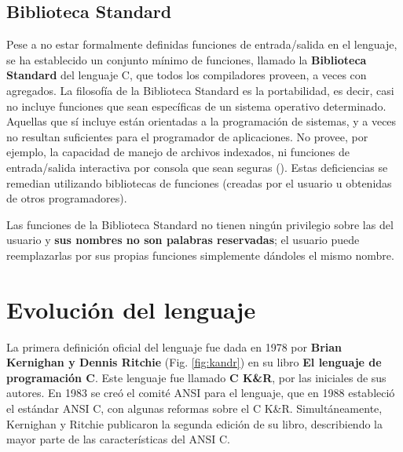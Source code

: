 \subsection{Biblioteca Standard}
Pese a no estar formalmente definidas funciones de entrada/salida en el lenguaje, se ha establecido un conjunto mínimo de funciones,
llamado la \textbf{Biblioteca Standard} del lenguaje C, que todos los
compiladores proveen, a veces con agregados. La filosofía de la
Biblioteca Standard es la portabilidad, es decir, casi no incluye
funciones que sean específicas de un sistema operativo determinado.
Aquellas que sí incluye están orientadas a la programación de sistemas, y a
veces no resultan suficientes para el programador de aplicaciones. No
provee, por ejemplo, la capacidad de manejo de archivos indexados, ni
funciones de entrada/salida interactiva por consola que sean seguras
(). Estas deficiencias
se remedian utilizando bibliotecas de funciones  (creadas por el usuario u obtenidas de
otros programadores). 

Las funciones de la Biblioteca Standard no tienen ningún
privilegio sobre las del usuario y \textbf{sus nombres no son palabras
reservadas}; el usuario puede reemplazarlas por sus propias funciones
simplemente dándoles el mismo nombre. 


\section{Evolución del lenguaje}
La primera definición oficial del lenguaje fue dada en 1978 por
\textbf{Brian Kernighan y Dennis Ritchie} (Fig. \ref{fig:kandr}) en su libro \textbf{El
lenguaje de programación C}. Este lenguaje fue llamado
\textbf{C K\&R}, por las iniciales de sus autores. En 1983 se creó el comité
ANSI para el lenguaje, que en 1988 estableció el estándar ANSI C, con algunas reformas
sobre el C K\&R. Simultáneamente, Kernighan y Ritchie publicaron la
segunda edición de su libro, describiendo la mayor parte de las
características del ANSI C. 


